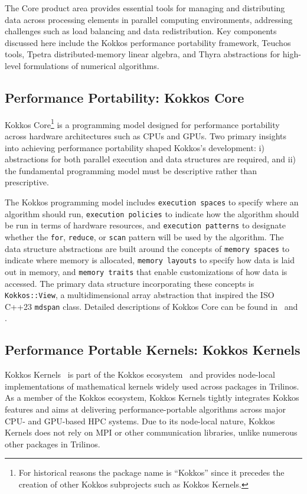 
The Core product area provides essential tools for managing and distributing data across processing elements in parallel computing environments, addressing challenges such as load balancing and data redistribution. Key components discussed here include the Kokkos performance portability framework, Teuchos tools, Tpetra distributed-memory linear algebra, and Thyra abstractions for high-level formulations of numerical algorithms.

\subsection{Performance Portability: Kokkos Core}\label{subsec:kokkos}
Kokkos Core\footnote{For historical reasons the package name is ``Kokkos'' since it precedes the creation of other Kokkos subprojects such as Kokkos Kernels.} is a programming model designed for performance portability across hardware architectures such as CPUs and GPUs. Two primary insights into achieving performance portability shaped Kokkos's development:
i) abstractions for both parallel execution and data structures are required, and
ii) the fundamental programming model must be descriptive rather than prescriptive.

The Kokkos programming model includes \texttt{execution spaces} to specify where an algorithm should run, \texttt{execution policies} to indicate how the algorithm should be run in terms of hardware resources, and \texttt{execution patterns} to designate whether the \texttt{for}, \texttt{reduce}, or \texttt{scan} pattern will be used by the algorithm. The data structure abstractions are built around the concepts of \texttt{memory spaces} to indicate where memory is allocated, \texttt{memory layouts} to specify how data is laid out in memory, and \texttt{memory traits} that enable customizations of how data is accessed. The primary data structure incorporating
these concepts is \texttt{Kokkos::View}, a multidimensional array abstraction that inspired
the ISO C++23 \texttt{mdspan} class. Detailed descriptions of Kokkos Core can be found
in~\cite{edwards2014} and \cite{trott2022kokkos}.

\subsection{Performance Portable Kernels: Kokkos Kernels}\label{subsec:kk}
Kokkos Kernels~\cite{rajamanickam2021kokkoskernels} is part of the Kokkos ecosystem~\cite{trott2021kokkos} and provides node-local implementations of mathematical kernels widely used across packages in Trilinos. As a member of the Kokkos ecosystem, Kokkos Kernels tightly integrates Kokkos features and aims at delivering performance-portable algorithms across major CPU- and GPU-based HPC systems. Due to its node-local nature, Kokkos Kernels does not rely on MPI or other communication libraries, unlike numerous other packages in Trilinos.

